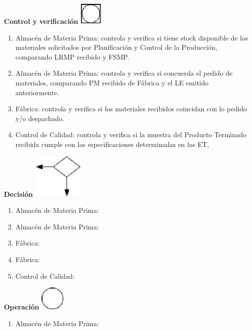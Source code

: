 \begin{center}
  \textbf{Control y verificación}
  \includegraphics{./Images/Simbolos/simbolo-Control-y-Verificacion.png}
\end{center}
\begin{enumerate}
  \item Almac\'en de Materia Prima: controla y verifica si tiene stock disponible de los materiales solicitados por Planificaci\'on y Control de la Producci\'on, comparando LRMP recibido y FSMP.
  \item Almac\'en de Materia Prima: controla y verifica si concuerda el pedido de materiales, comparando PM recibido de F\'abrica y el LE emitido anteriormente.
  \item F\'abrica: controla y verifica si los materiales recibidos coincidan con lo pedido y/o despachado.
  \item Control de Calidad: controla y verifica si la muestra del Producto Terminado recibida cumple con las especificaciones determinadas en las ET,
\end{enumerate}

\begin{center}
  \textbf{Decisión}
  \includegraphics{./Images/Simbolos/simbolo-Decision.png}
\end{center}
\begin{enumerate}
  \item Almac\'en de Materia Prima: 
  \item Almac\'en de Materia Prima: 
  \item F\'abrica: 
  \item F\'abrica: 
  \item Control de Calidad: 
\end{enumerate}

\begin{center}
  \textbf{Operación}
  \includegraphics{./Images/Simbolos/simbolo-Operacion.png}
\end{center}
\begin{enumerate}
  \item Almac\'en de Materia Prima:
\end{enumerate}

